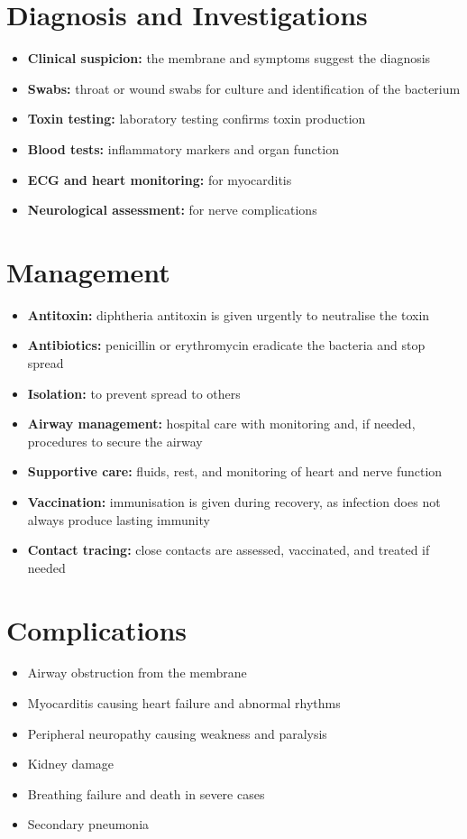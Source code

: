 \section*{Diagnosis and Investigations}
\begin{itemize}
    \item \textbf{Clinical suspicion:} the membrane and symptoms suggest the diagnosis
    \item \textbf{Swabs:} throat or wound swabs for culture and identification of the bacterium
    \item \textbf{Toxin testing:} laboratory testing confirms toxin production
    \item \textbf{Blood tests:} inflammatory markers and organ function
    \item \textbf{ECG and heart monitoring:} for myocarditis
    \item \textbf{Neurological assessment:} for nerve complications
\end{itemize}

\section*{Management}
\begin{itemize}
    \item \textbf{Antitoxin:} diphtheria antitoxin is given urgently to neutralise the toxin
    \item \textbf{Antibiotics:} penicillin or erythromycin eradicate the bacteria and stop spread
    \item \textbf{Isolation:} to prevent spread to others
    \item \textbf{Airway management:} hospital care with monitoring and, if needed, procedures to secure the airway
    \item \textbf{Supportive care:} fluids, rest, and monitoring of heart and nerve function
    \item \textbf{Vaccination:} immunisation is given during recovery, as infection does not always produce lasting immunity
    \item \textbf{Contact tracing:} close contacts are assessed, vaccinated, and treated if needed
\end{itemize}

\section*{Complications}
\begin{itemize}
    \item Airway obstruction from the membrane
    \item Myocarditis causing heart failure and abnormal rhythms
    \item Peripheral neuropathy causing weakness and paralysis
    \item Kidney damage
    \item Breathing failure and death in severe cases
    \item Secondary pneumonia
\end{itemize}

